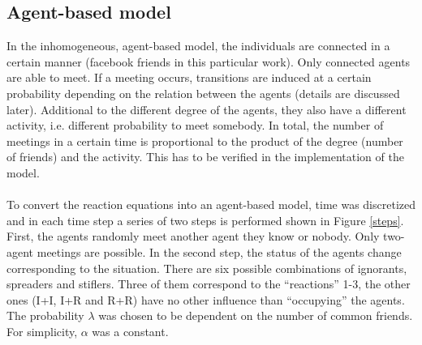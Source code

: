 \subsection{Agent-based model}

In the inhomogeneous, agent-based model, the individuals are connected in a certain manner (facebook friends in this particular work). Only connected agents are able to meet. If a meeting occurs, transitions are induced at a certain probability depending on the relation between the agents (details are discussed later). Additional to the different degree of the agents, they also have a different activity, i.e. different probability to meet somebody. In total, the number of meetings in a certain time is proportional to the product of the degree (number of friends) and the activity. This has to be verified in the implementation of the model.
\\
\\
To convert the reaction equations into an agent-based model, time was discretized
and in each time step a series of two steps is performed shown in Figure \ref{steps}. First, the agents randomly meet another agent they know or nobody. Only two-agent meetings are possible. In the second step, the status of the agents change corresponding to the situation. There are six possible combinations of ignorants, spreaders and stiflers. Three of them correspond to the ``reactions'' 1-3, the other ones (I+I, I+R and R+R) have no other influence than ``occupying'' the agents. The probability $\lambda$ was chosen to be dependent on the number of common friends. For simplicity, $\alpha$ was a constant.